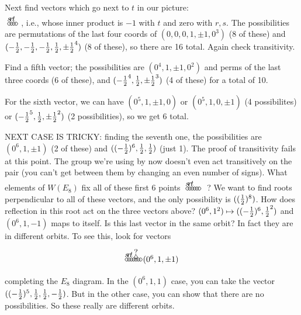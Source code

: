 \begin{itemize}
 Next find vectors which go next to $t$ in our picture:\\
  $\begin{xy}
   (0,0) *+!D{s} *\cir<2pt>{};
   (1,0) *+!D{r} *\cir<2pt>{} **@{-};
   p+(1,0) *+!D{t} *\cir<2pt>{} **@{-};
   p+(1,0) *\cir<2pt>{} **@{.};
 \end{xy}\ $,
 i.e., whose inner product is $-1$ with $t$ and zero with $r,s$. The possibilities are
 permutations of the last four coords of $(0,0,0,1,\pm 1, 0^3)$ (8 of these) and
 $(-\frac{1}{2},-\frac{1}{2},-\frac{1}{2},\frac{1}{2},\pm \frac{1}{2}^4)$ (8 of these), so there are 16 total. Again
 check transitivity.

 Find a fifth vector; the possibilities are $(0^4,1,\pm 1, 0^2)$ and perms of the last
 three coords (6 of these), and $(-\frac{1}{2}^4,\frac{1}{2}, \pm \frac{1}{2}^3)$ (4 of these) for a
 total of 10.

 For the sixth vector, we can have $(0^5, 1,\pm 1, 0)$ or $(0^5, 1, 0, \pm 1)$ (4
possibilites) or $(-\frac{1}{2}^5,\frac{1}{2},\pm \frac{1}{2}^2)$ (2 possibilities), so we get 6 total.

 NEXT CASE IS TRICKY: finding the seventh one, the possibilities are $(0^6,1,\pm 1)$
 (2 of these) and $((-\frac{1}{2})^6,\frac{1}{2},\frac{1}{2})$ (just 1). The proof of transitivity fails
 at this point. The group we're using by now doesn't even act transitively on the pair
 (you can't get between them by changing an even number of signs). What elements of
 $W(E_8)$ fix all of these first 6 points $\begin{xy}
   (0,0) *+!D{s} *\cir<2pt>{};
   (1,0) *+!D{r} *\cir<2pt>{} **@{-};
   p+(1,0) *+!D{t} *\cir<2pt>{} **@{-};
   p+(1,0) *\cir<2pt>{} **@{-};
   p+(1,0) *\cir<2pt>{} **@{-};
   p+(1,0) *\cir<2pt>{} **@{-};
 \end{xy}\ $
 ? We want to find roots perpendicular to all of these vectors, and the only
 possibility is $((\frac{1}{2})^8)$. How does reflection in this root act on the three vectors
 above? $(0^6, 1^2)\mapsto ((-\frac{1}{2})^6,\frac{1}{2}^2)$ and $(0^6,1,-1)$ maps to
 itself. Is this last vector in the same orbit? In fact they are in different orbits.
 To see this, look for vectors
 \[\begin{xy}
   (0,0) *+!D{s} *\cir<2pt>{};
   (1,0) *+!D{r} *\cir<2pt>{} **@{-};
   p+(1,0) *+!D{t} *\cir<2pt>{} **@{-};
   p+(1,0) *\cir<2pt>{} **@{-};
   p+(1,0) *\cir<2pt>{} **@{-};
    p+(0,1) *+!D{?} *\cir<2pt>{} **@{.},
   p+(1,0) *\cir<2pt>{} **@{-};
   p+(1,0) *+!L{(0^6,1,\pm 1)} *\cir<2pt>{} **@{-};
 \end{xy}\]

 completing the $E_8$ diagram. In the $(0^6, 1,1)$ case, you can take the vector
 $((-\frac{1}{2})^5,\frac{1}{2},\frac{1}{2},-\frac{1}{2})$. But in the other case, you can show that there are no
 possibilities. So these really are different orbits.


\end{itemize}
